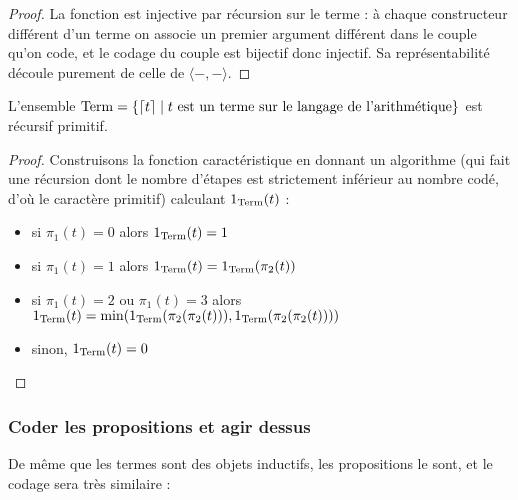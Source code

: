 \begin{proof}
    La fonction est injective par récursion sur le terme : à chaque constructeur différent d'un terme on associe un premier argument différent dans le couple qu'on code, et le codage du couple est bijectif donc injectif. Sa représentabilité découle purement de celle de $\langle -,-\rangle$.
\end{proof}

\begin{lem}
    L'ensemble $\mathrm{Term} = \{ \lceil t \rceil \mid t \text{ est un terme sur le langage de l'arithmétique}\}$ est récursif primitif.
\end{lem}

\begin{proof}
    Construisons la fonction caractéristique en donnant un algorithme (qui fait une récursion dont le nombre d'étapes est strictement inférieur au nombre codé, d'où le caractère primitif) calculant $1_{\mathrm{Term}}(t)$ :
    \begin{itemize}[label=$\bullet$]
        \item si $\pi_1(t) = 0$ alors $1_{\mathrm{Term}}(t)=1$
        \item si $\pi_1(t) = 1$ alors $1_{\mathrm{Term}}(t)=1_{\mathrm{Term}}(\pi_2(t))$
        \item si $\pi_1(t) = 2$ ou $\pi_1(t) = 3$ alors $1_{\mathrm{Term}}(t)=\min(1_{\mathrm{Term}}(\pi_2(\pi_2(t))),1_{\mathrm{Term}}(\pi_2(\pi_2(t))))$
        \item sinon, $1_{\mathrm{Term}}(t) = 0$
    \end{itemize}
\end{proof}

\subsubsection{Coder les propositions et agir dessus}

De même que les termes sont des objets inductifs, les propositions le sont, et le codage sera très similaire :

